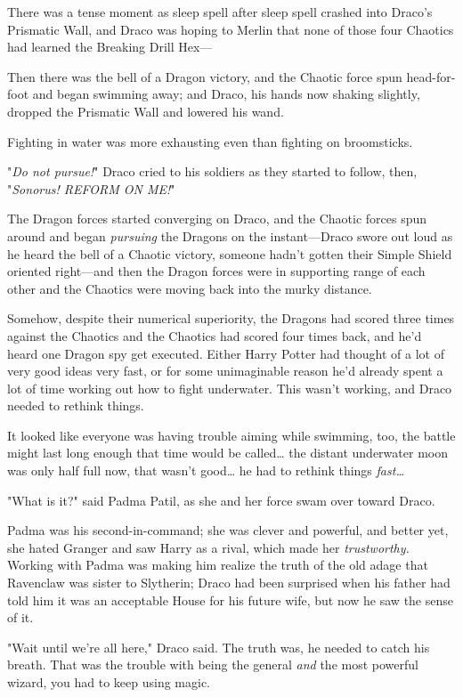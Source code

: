 There was a tense moment as sleep spell after sleep spell crashed into Draco's 
Prismatic Wall, and Draco was hoping to Merlin that none of those four Chaotics 
had learned the Breaking Drill Hex---

Then there was the bell of a Dragon victory, and the Chaotic force spun 
head-for-foot and began swimming away; and Draco, his hands now shaking 
slightly, dropped the Prismatic Wall and lowered his wand.

Fighting in water was more exhausting even than fighting on broomsticks.

"\emph{Do not pursue!}" Draco cried to his soldiers as they started to follow, 
then, "\emph{Sonorus! REFORM ON ME!}"

The Dragon forces started converging on Draco, and the Chaotic forces spun 
around and began \emph{pursuing} the Dragons on the instant---Draco swore out 
loud as he heard the bell of a Chaotic victory, someone hadn't gotten their 
Simple Shield oriented right---and then the Dragon forces were in supporting 
range of each other and the Chaotics were moving back into the murky distance.

Somehow, despite their numerical superiority, the Dragons had scored three 
times against the Chaotics and the Chaotics had scored four times back, and 
he'd heard one Dragon spy get executed. Either Harry Potter had thought of a 
lot of very good ideas very fast, or for some unimaginable reason he'd already 
spent a lot of time working out how to fight underwater. This wasn't working, 
and Draco needed to rethink things.

It looked like everyone was having trouble aiming while swimming, too, the 
battle might last long enough that time would be called{\ldots} the distant 
underwater moon was only half full now, that wasn't good{\ldots} he had to 
rethink things \emph{fast{\ldots}}

"What is it?" said Padma Patil, as she and her force swam over toward Draco.

Padma was his second-in-command; she was clever and powerful, and better yet, 
she hated Granger and saw Harry as a rival, which made her \emph{trustworthy.} 
Working with Padma was making him realize the truth of the old adage that 
Ravenclaw was sister to Slytherin; Draco had been surprised when his father had 
told him it was an acceptable House for his future wife, but now he saw the 
sense of it.

"Wait until we're all here," Draco said. The truth was, he needed to catch his 
breath. That was the trouble with being the general \emph{and} the most 
powerful wizard, you had to keep using magic.

